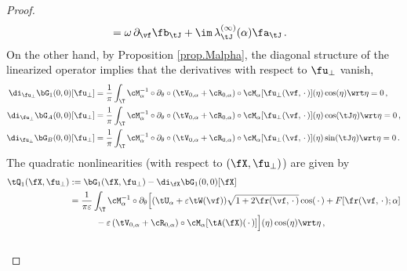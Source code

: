 \documentclass[a4paper,reqno,10pt]{article}
\newcommand{\pa}{\partial}
\begin{document}
\begin{proof}
\begin{equation}
\begin{aligned}
				& =  \omega\,\pa_{\vf}\fb_{\tJ}  + \im\, \lambda_{\tJ}^{(\infty)}(\alpha) \fa_{\tJ}  \,.
			\end{aligned}
	\end{equation}
	On the other hand, by Proposition \ref{prop.Malpha}, the diagonal structure of the linearized operator implies that the derivatives with respect to \( \fu_{\perp} \) vanish,
	\begin{equation}
				\begin{aligned}
				\di_{\fu_{\perp}}\bG_{1}(0,0)[\fu_{\perp}] & ={\frac1\pi}\int_{\T} \cM_{\alpha}^{-1}\circ \pa_{\theta} \circ (\tV_{0,\alpha}+\cR_{0,\alpha}) \circ \cM_{\alpha}[ \fu_{\perp}(\vf,\,\cdot\,) ](\eta) \cos(\eta) \wrt \eta = 0\,,\\ 
				\di_{\fu_{\perp}}\bG_{A}(0,0)[\fu_{\perp}] & ={\frac1\pi}\int_{\T} \cM_{\alpha}^{-1}\circ \pa_{\theta} \circ (\tV_{0,\alpha}+\cR_{0,\alpha}) \circ \cM_{\alpha}[ \fu_{\perp}(\vf,\,\cdot\,) ](\eta) \cos(\tJ\eta) \wrt \eta = 0\,,\\ 
				\di_{\fu_{\perp}}\bG_{B}(0,0)[\fu_{\perp}]& ={\frac1\pi}\int_{\T} \cM_{\alpha}^{-1}\circ \pa_{\theta} \circ (\tV_{0,\alpha}+\cR_{0,\alpha}) \circ \cM_{\alpha}[ \fu_{\perp}(\vf,\,\cdot\,) ](\eta) \sin(\tJ\eta) \wrt \eta = 0 \,.
			\end{aligned}
	\end{equation}
The  quadratic nonlinearities (with respect to $(\fX,\fu_{\perp})$) are given by 
	\begin{align}
		&
			\begin{aligned}
				\tQ_{1} (\fX,\fu_{\perp}) &:= 	\bG_{1}(\fX,\fu_{\perp})- 	\di_{\fX}\bG_{1}(0,0)[\fX]\\
				&=\frac{1}{{\pi\varepsilon}} \int_{\T} \cM_{\alpha}^{-1}\circ \pa_{\theta}\Big[ (\tU_{\alpha}+ \varepsilon{\tW(\vf)})  \sqrt{1+2 \fr(\vf,\,\cdot\,)} \cos(\,\cdot\,) + F[\fr(\vf,\,\cdot\,);\alpha] \\
				&\quad \quad \quad  -\varepsilon \, (\tV_{0,\alpha}+\cR_{0,\alpha})\circ \cM_{\alpha}[ \tA(\fX)(\,\cdot\,)  ] \Big](\eta) \cos(\eta) \wrt\eta \,,  
			\end{aligned}
        \label{Q1} \\
		& 

\end{align}
\end{proof}
\end{document}
